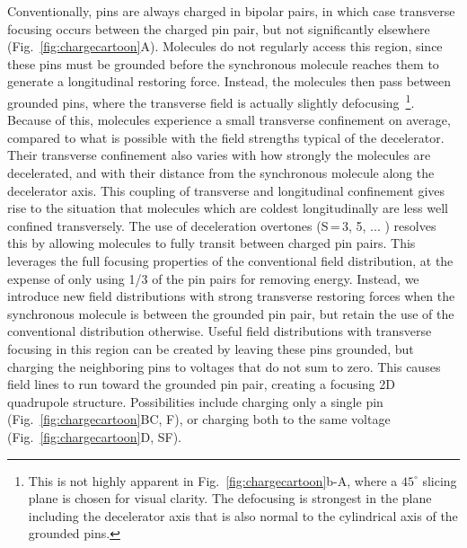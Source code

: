 \documentclass[%
 reprint,
 amsmath,amssymb,
 aps,
prl,
]{revtex4-1}
\begin{document}
Conventionally, pins are always charged in bipolar pairs, in which case transverse focusing occurs between the charged pin pair, but not significantly elsewhere (Fig.~\ref{fig:chargecartoon}A).
Molecules do not regularly access this region, since these pins must be grounded before the synchronous molecule reaches them to generate a longitudinal restoring force.
Instead, the molecules then pass between grounded pins, where the transverse field is actually slightly defocusing~\footnote{This is not highly apparent in Fig.~\ref{fig:chargecartoon}b-A, where a $45^\circ$ slicing plane is chosen for visual clarity. The defocusing is strongest in the plane including the decelerator axis that is also normal to the cylindrical axis of the grounded pins.}.
Because of this, molecules experience a small transverse confinement on average, compared to what is possible with the field strengths typical of the decelerator. 
Their transverse confinement also varies with how strongly the molecules are decelerated, and with their distance from the synchronous molecule along the decelerator axis. 
This coupling of transverse and longitudinal confinement gives rise to the situation that molecules which are coldest longitudinally are less well confined transversely.
The use of deceleration overtones (S\,=\,3, 5, ... ) \cite{VanDeMeerakker2005a} resolves this by allowing molecules to fully transit between charged pin pairs. 
This leverages the full focusing properties of the conventional field distribution, at the expense of only using 1/3 of the pin pairs for removing energy. 
Instead, we introduce new field distributions with strong transverse restoring forces when the synchronous molecule is between the grounded pin pair, but retain the use of the conventional distribution otherwise.
Useful field distributions with transverse focusing in this region can be created by leaving these pins grounded, but charging the neighboring pins to voltages that do not sum to zero.
This causes field lines to run toward the grounded pin pair, creating a focusing 2D quadrupole structure.
Possibilities include charging only a single pin (Fig.~\ref{fig:chargecartoon}BC, F), or charging both to the same voltage (Fig.~\ref{fig:chargecartoon}D, SF).
\end{document}
